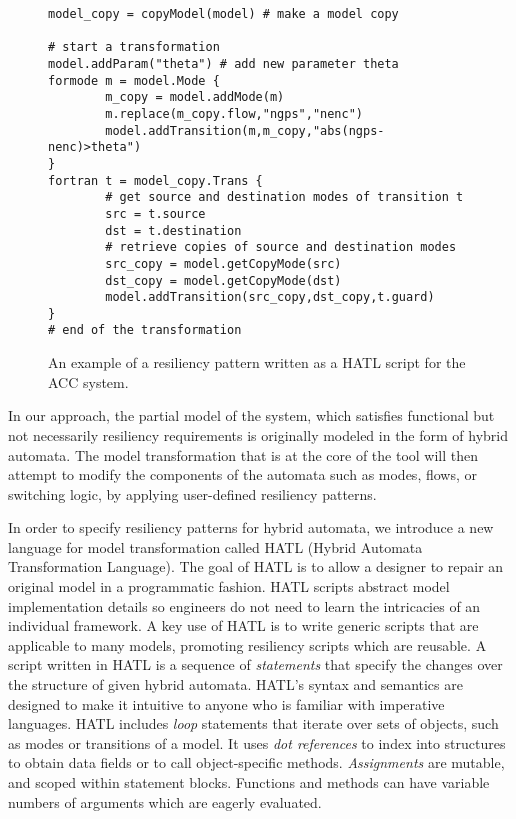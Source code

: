 \begin{figure}[!t]%
\begin{lstlisting}[basicstyle=\ttfamily\footnotesize, numbers=none]
model_copy = copyModel(model) # make a model copy

# start a transformation
model.addParam("theta") # add new parameter theta
formode m = model.Mode {
		m_copy = model.addMode(m)
		m.replace(m_copy.flow,"ngps","nenc")
		model.addTransition(m,m_copy,"abs(ngps-nenc)>theta")
}
fortran t = model_copy.Trans {
		# get source and destination modes of transition t
		src = t.source
		dst = t.destination
		# retrieve copies of source and destination modes
		src_copy = model.getCopyMode(src)
		dst_copy = model.getCopyMode(dst)
		model.addTransition(src_copy,dst_copy,t.guard)
}
# end of the transformation
\end{lstlisting}
\vspace{-0.5em}%
\caption{An example of a resiliency pattern written as a HATL script for the ACC system.}%
%
	\vspace{-1.5em}%
\end{figure}

In our approach, the partial model of the system, which satisfies functional but not necessarily resiliency requirements is originally modeled in the form of hybrid automata. The model transformation that is at the core of the \toolreaffirm tool will then attempt to modify the components of the automata such as modes, flows, or switching logic, by applying user-defined resiliency patterns.


In order to specify resiliency patterns for hybrid automata, we introduce a new language for model transformation called HATL (Hybrid Automata Transformation Language). The goal of HATL is to allow a designer to repair an original model in a programmatic fashion. HATL scripts abstract model implementation details so engineers do not need to learn the intricacies of an individual framework. A key use of HATL is to write generic scripts that are applicable to many models, promoting resiliency scripts which are reusable.
%
A script written in HATL is a sequence of \emph{statements} that specify the changes over the structure of given hybrid automata. HATL's syntax and semantics are designed to make it intuitive to anyone who is familiar with imperative languages. HATL includes \emph{loop} statements that iterate over sets of objects, such as modes or transitions of a model. It uses \emph{dot references} to index into structures to obtain data fields or to call object-specific methods. \emph{Assignments} are mutable, and scoped within statement blocks. Functions and methods can have variable numbers of arguments which are eagerly evaluated.

